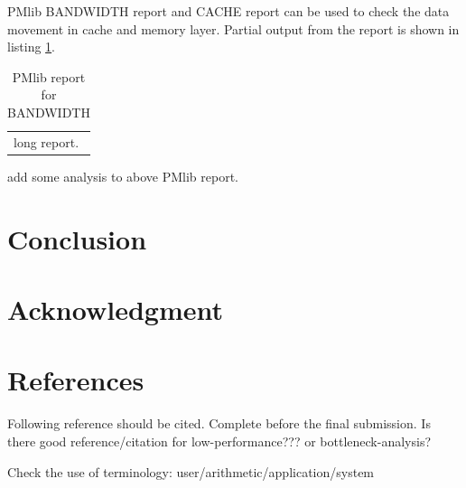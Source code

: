 \documentclass[conference]{IEEEtran}
\begin{document}
PMlib BANDWIDTH report and CACHE report can be used
to check the data movement in cache and memory layer.
Partial output from the report is shown in listing \ref{tab:report-BANDWIDTH}.

\begin{table}[tb]
\scriptsize
\caption{PMlib report for BANDWIDTH}
\label{tab:report-BANDWIDTH}
\footnotesize
\begin{tabular}{l} \hline
\scriptsize
long report.


\end{tabular}
\end{table}

{\color{blue}
add some analysis to above PMlib report.
}

\section{Conclusion}

\section*{Acknowledgment}

\section*{References}

{\color{blue}
Following reference should be cited. Complete before the final submission.
Is there good reference/citation for low-performance???
or bottleneck-analysis?
}

{\color{blue} Check the use of terminology: user/arithmetic/application/system}




\end{document}

